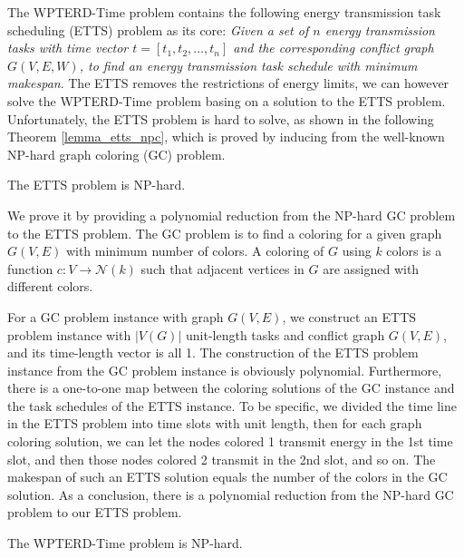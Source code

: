 \documentclass[journal,10pt]{IEEEtran}
\begin{document}
The WPTERD-Time problem contains the following energy transmission task scheduling (ETTS) problem as its core: \textit{Given a set of $n$ energy transmission tasks with time vector $t{=}[t_1,t_2,\ldots,t_n]$ and the corresponding conflict graph $G(V,E,W)$, to find an energy transmission task schedule with minimum makespan}. The ETTS removes the restrictions of energy limits, we can however solve the WPTERD-Time problem basing on a solution to the ETTS problem. Unfortunately, the ETTS problem is hard to solve, as shown in the following Theorem \ref{lemma_etts_npc}, which is proved by inducing from the well-known NP-hard graph coloring (GC) problem.

\begin{theorem}
\label{lemma_etts_npc}
The ETTS problem is NP-hard.
\end{theorem}

\begin{IEEEproof}
We prove it by providing a polynomial reduction from the NP-hard GC problem to the ETTS problem. The GC problem is to find a coloring for a given graph $G(V,E)$ with minimum number of colors. A coloring of $G$ using $k$ colors is a function $c{:}V{\rightarrow}\mathcal{N}(k)$ such that adjacent vertices in $G$ are assigned with different colors.

For a GC problem instance with graph $G(V,E)$, we construct an ETTS problem instance with $|V(G)|$ unit-length tasks and conflict graph $G(V,E)$, and its time-length vector is all 1. The construction of the ETTS problem instance from the GC problem instance is obviously polynomial. Furthermore, there is a one-to-one map between the coloring solutions of the GC instance and the task schedules of the ETTS instance. To be specific, we divided the time line in the ETTS problem into time slots with unit length, then for each graph coloring solution, we can let the nodes colored 1 transmit energy in the 1st time slot, and then those nodes colored 2 transmit in the 2nd slot, and so on. The makespan of such an ETTS solution equals the number of the colors in the GC solution. As a conclusion, there is a polynomial reduction from the NP-hard GC problem to our ETTS problem.
\end{IEEEproof}

\begin{theorem}
\label{lemma_wpterd_time_npc}
The WPTERD-Time problem is NP-hard.
\end{theorem}
\end{document}
